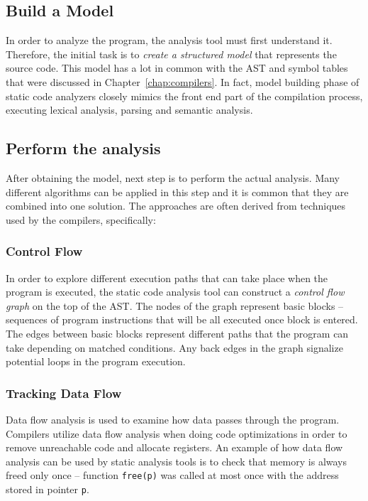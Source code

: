 \documentclass[
  digital, %
  table,   %
  lof,     %
  lot,     %
  oneside,
]{fithesis3}
\begin{document}
\subsection{Build a Model}
In order to analyze the program, the analysis tool must first understand it. Therefore, the initial task is to \textit{create a structured model} that represents the source code. This model has a lot in common with the AST and symbol tables that were discussed in Chapter~\ref{chap:compilers}. In fact, model building phase of static code analyzers closely mimics the front end part of the compilation process, executing lexical analysis, parsing and semantic analysis.

\subsection{Perform the analysis}
After obtaining the model, next step is to perform the actual analysis. Many different algorithms can be applied in this step and it is common that they are combined into one solution. The approaches are often derived from techniques used by the compilers, specifically:

\subsubsection{Control Flow}
In order to explore different execution paths that can take place when the program is executed, the static code analysis tool can construct a \textit{control flow graph} on the top of the AST. The nodes of the graph represent basic blocks -- sequences of program instructions that will be all executed once block is entered. The edges between basic blocks represent different paths that the program can take depending on matched conditions. Any back edges in the graph signalize potential loops in the program execution.

\subsubsection{Tracking Data Flow}
Data flow analysis is used to examine how data passes through the program. Compilers utilize data flow analysis when doing code optimizations in order to remove unreachable code and allocate registers. An example of how data flow analysis can be used by static analysis tools is to check that memory is always freed only once -- function \texttt{free(p)} was called at most once with the address stored in pointer \texttt{p}.
\end{document}
